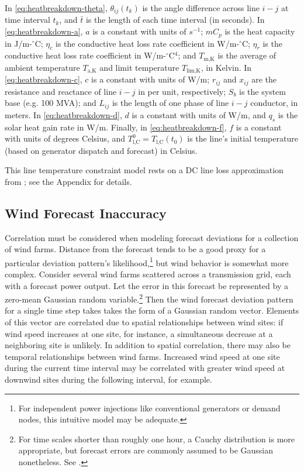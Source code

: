 \documentclass[journal,twoside]{IEEEtran}
\begin{document}
In \eqref{eq:heatbreakdown-theta}, $\theta_{ij}(t_k)$ is the angle difference across line $i-j$ at time interval $t_k$, and $\bar{t}$ is the length of each time interval (in seconds). In \eqref{eq:heatbreakdown-a}, $a$ is a constant with units of $s^{-1}$; $mC_p$ is the heat capacity in J/m-$^\circ$C; $\eta_c$ is the conductive heat loss rate coefficient in W/m-$^\circ$C; $\eta_r$ is the conductive heat loss rate coefficient in W/m-$^\circ$C$^4$; and $T_\text{m,K}$ is the average of ambient temperature $T_\text{a,K}$ and limit temperature $T_\text{lim,K}$, in Kelvin. In \eqref{eq:heatbreakdown-c}, $c$ is a constant with units of W/m; $r_{ij}$ and $x_{ij}$ are the resistance and reactance of line $i-j$ in per unit, respectively; $S_b$ is the system base (e.g. 100 MVA); and $L_{ij}$ is the length of one phase of line $i-j$ conductor, in meters. In \eqref{eq:heatbreakdown-d}, $d$ is a constant with units of W/m, and $q_s$ is the solar heat gain rate in W/m. Finally, in \eqref{eq:heatbreakdown-f}, $f$ is a constant with units of degrees Celsius, and $T_\text{l,C}^0 = T_\text{l,C}(t_0)$ is the line's initial temperature (based on generator dispatch and forecast) in Celsius.

This line temperature constraint model rests on a DC line loss approximation from \cite{almassalkhi2014}; see the Appendix for details.

\subsection{Wind Forecast Inaccuracy}\label{sec:models-wind}
Correlation must be considered when modeling forecast deviations for a collection of wind farms. Distance from the forecast tends to be a good proxy for a particular deviation pattern's likelihood,\footnote{For independent power injections like conventional generators or demand nodes, this intuitive model may be adequate.} but wind behavior is somewhat more complex. Consider several wind farms scattered across a transmission grid, each with a forecast power output. Let the error in this forecast be represented by a zero-mean Gaussian random variable.\footnote{For time scales shorter than roughly one hour, a Cauchy distribution is more appropriate, but forecast errors are commonly assumed to be Gaussian nonetheless. See \cite{hodge2011}.} Then the wind forecast deviation pattern for a single time step takes takes the form of a Gaussian random vector. Elements of this vector are correlated due to spatial relationships between wind sites: if wind speed increases at one site, for instance, a simultaneous decrease at a neighboring site is unlikely. In addition to spatial correlation, there may also be temporal relationships between wind farms. Increased wind speed at one site during the current time interval may be correlated with greater wind speed at downwind sites during the following interval, for example.
\end{document}
